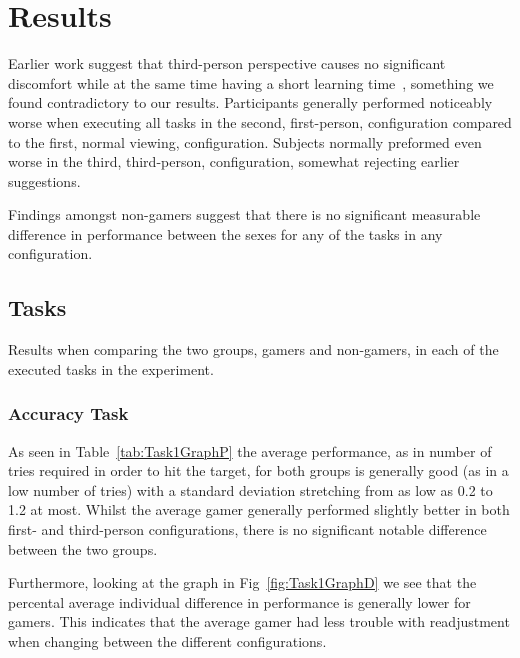\documentclass[runningheads,a4paper,oribibl]{llncs}
\begin{document}
\section{Results}
Earlier work suggest that third-person perspective causes no significant discomfort while at the same time having a short learning time~\cite{nakamura20103pi}, something we found contradictory to our results. Participants generally performed noticeably worse when executing all tasks in the second, first-person, configuration compared to the first, normal viewing, configuration. Subjects normally preformed even worse in the third, third-person, configuration, somewhat rejecting earlier suggestions. 

Findings amongst non-gamers suggest that there is no significant measurable difference in performance between the sexes for any of the tasks in any configuration.







\subsection{Tasks}
Results when comparing the two groups, gamers and non-gamers, in each of the executed tasks in the experiment.


\subsubsection{Accuracy Task}
As seen in Table~\ref{tab:Task1GraphP} the average performance, as in number of tries required in order to hit the target, for both groups is generally good (as in a low number of tries) with a standard deviation stretching from as low as 0.2 to 1.2 at most. Whilst the average gamer generally performed slightly better in both first- and third-person configurations, there is no significant notable difference between the two groups.

Furthermore, looking at the graph in Fig~\ref{fig:Task1GraphD} we see that the percental average individual difference in performance is generally lower for gamers. This indicates that the average gamer had less trouble with readjustment when changing between the different configurations.   
\end{document}
